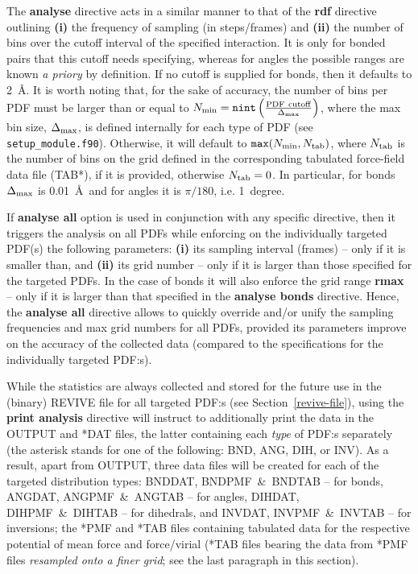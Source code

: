The {\bf analyse} directive acts in a similar manner to that
of the {\bf rdf} directive outlining {\bf (i)} the frequency
of sampling (in steps/frames) and {\bf (ii)} the number of
bins over the cutoff interval of the specified interaction.
It is only for bonded pairs that this cutoff needs specifying,
whereas for angles the possible ranges are known {\em a priory}
by definition. If no cutoff is supplied for bonds, then it
defaults to 2~\AA.  It is worth noting that, for the sake of
accuracy, the number of bins per PDF must be larger than or equal
to $N_{\rm min} = {\tt nint} \left( \frac{\rm PDF~cutoff}{\Delta_{\rm max}} \right)$,
where the max bin size, $\Delta_{\rm max}$, is defined internally
for each type of PDF (see {\tt setup\_module.f90}).  Otherwise,
it will default to ${\tt max}(N_{\rm min},N_{\rm tab})$,
where $N_{\rm tab}$ is the number of bins on the grid defined
in the corresponding tabulated force-field data file (TAB*),
if it is provided, otherwise $N_{\rm tab}=0$.
In particular, for bonds $\Delta_{\rm max}$ is 0.01~\AA~and
for angles it is $\pi/180$, i.e. 1~degree.

If {\bf analyse all} option is used in conjunction with any specific
directive, then it triggers the analysis on all PDFs while enforcing
on the individually targeted PDF(s) the following parameters: {\bf (i)}
its sampling interval (frames) -- only if it is smaller than,
and {\bf (ii)} its grid number -- only if it is larger than
those specified for the targeted PDFs.
In the case of bonds it will also enforce the grid range {\bf rmax} --
only if it is larger than that specified in the {\bf analyse bonds}
directive. Hence, the {\bf analyse all} directive allows to
quickly override and/or unify the sampling frequencies and
max grid numbers for all PDFs, provided its parameters improve
on the accuracy of the collected data (compared to the specifications
for the individually targeted PDF:s).

While the statistics are always collected and stored for the
future use in the (binary) REVIVE file for all targeted PDF:s
(see Section~\ref{revive-file}), using the {\bf print analysis}
directive will instruct \D to additionally print the data in
the OUTPUT and *DAT files, the latter containing each {\it type}
of PDF:s separately (the asterisk stands for one of the following: BND,
ANG, DIH, or INV).  As a result, apart from OUTPUT, three data files
will be created for each of the targeted distribution types:
BNDDAT, BNDPMF~\&~BNDTAB -- for bonds, ANGDAT, ANGPMF~\&~ANGTAB
-- for angles, DIHDAT, DIHPMF~\&~DIHTAB -- for dihedrals, and INVDAT,
INVPMF~\&~INVTAB -- for inversions; the *PMF and *TAB files containing
tabulated data for the respective potential of mean force and
force/virial (*TAB files bearing the data from *PMF files
{\em resampled onto a finer grid}; see the last paragraph
in this section).

